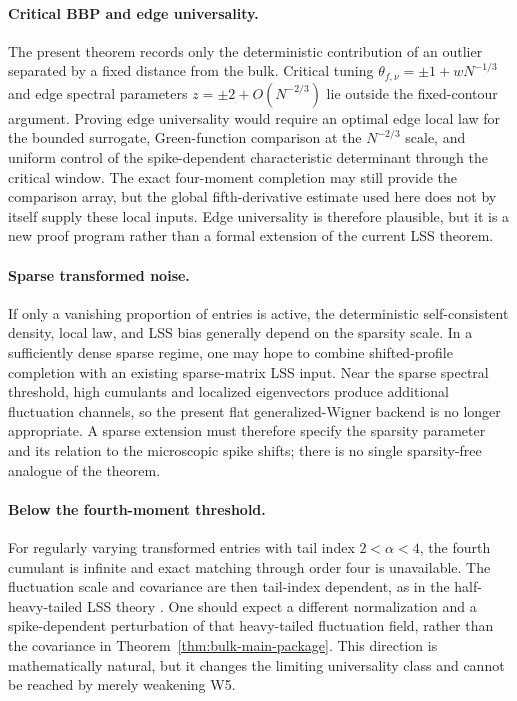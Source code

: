 \documentclass[11pt]{article}
\theoremstyle{definition}
\theoremstyle{remark}
\begin{document}
\paragraph*{Critical BBP and edge universality.}
The present theorem records only the deterministic contribution of an outlier
separated by a fixed distance from the bulk.  Critical tuning
\(\theta_{f,\nu}=\pm1+wN^{-1/3}\) and edge spectral parameters
\(z=\pm2+O(N^{-2/3})\) lie outside the fixed-contour argument.  Proving edge
universality would require an optimal edge local law for the bounded
surrogate, Green-function comparison at the $N^{-2/3}$ scale, and uniform
control of the spike-dependent characteristic determinant through the
critical window.  The exact four-moment completion may still provide the
comparison array, but the global fifth-derivative estimate used here does not
by itself supply these local inputs.  Edge universality is therefore
plausible, but it is a new proof program rather than a formal extension of the
current LSS theorem.

\paragraph*{Sparse transformed noise.}
If only a vanishing proportion of entries is active, the deterministic
self-consistent density, local law, and LSS bias generally depend on the
sparsity scale.  In a sufficiently dense sparse regime, one may hope to
combine shifted-profile completion with an existing sparse-matrix LSS input.
Near the sparse spectral threshold, high cumulants and localized eigenvectors
produce additional fluctuation channels, so the present flat
generalized-Wigner backend is no longer appropriate.  A sparse extension must
therefore specify the sparsity parameter and its relation to the microscopic
spike shifts; there is no single sparsity-free analogue of the theorem.

\paragraph*{Below the fourth-moment threshold.}
For regularly varying transformed entries with tail index
\(2<\alpha<4\), the fourth cumulant is infinite and exact matching through
order four is unavailable.  The fluctuation scale and covariance are then
tail-index dependent, as in the half-heavy-tailed LSS theory
\cite{BenaychGeorgesMaltsev2016,LodhiaMaltsev2023}.  One should expect a
different normalization and a spike-dependent perturbation of that
heavy-tailed fluctuation field, rather than the covariance in
Theorem~\ref{thm:bulk-main-package}.  This direction is mathematically
natural, but it changes the limiting universality class and cannot be reached
by merely weakening W5.
\end{document}
